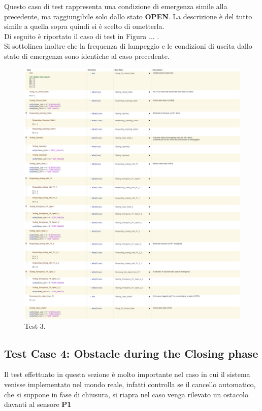 \documentclass[12pt]{article}
\begin{document}
Questo caso di test rappresenta una condizione di emergenza simile alla precedente, ma raggiungibile solo dallo stato \textbf{OPEN}. La descrizione è del tutto simile a quella sopra quindi si è scelto di ometterla. \\
Di seguito è riportato il caso di test in Figura ... .\\
Si sottolinea inoltre che la frequenza di lampeggio e le condizioni di uscita dallo stato di emergenza sono identiche al caso precedente.
\begin{figure}[H]
    
    \hspace{-2.3cm} %
    \includegraphics[width=1.3\textwidth]{Immagini_Test/Test_3_img.PNG}
    \caption{Test 3.}
    \label{fig:Test_3}
\end{figure}


\subsection{Test Case 4: Obstacle during the Closing phase}

Il test effettuato in questa sezione è molto importante nel caso in cui il sistema venisse implementato nel mondo reale, infatti controlla se il cancello automatico, che si suppone in fase di chiusura, si riapra nel caso venga rilevato un ostacolo davanti al sensore \textbf{P1}
\end{document}

